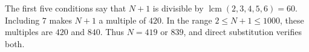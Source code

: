 The first five conditions say that $N+1$ is divisible by $\operatorname{lcm}(2,3,4,5,6)=60$. Including $7$ makes $N+1$ a multiple of $420$. In the range $2\le N+1\le 1000$, these multiples are $420$ and $840$. Thus $\boxed{N=419\text{ or }839}$, and direct substitution verifies both.
